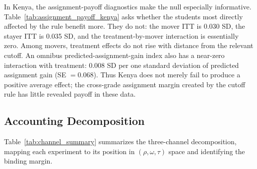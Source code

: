 \documentclass[11pt]{article}
\begin{document}
In Kenya, the assignment-payoff diagnostics make the null especially informative. Table~\ref{tab:assignment_payoff_kenya} asks whether the students most directly affected by the rule benefit more. They do not: the mover ITT is 0.030 SD, the stayer ITT is 0.035 SD, and the treatment-by-mover interaction is essentially zero. Among movers, treatment effects do not rise with distance from the relevant cutoff. An omnibus predicted-assignment-gain index also has a near-zero interaction with treatment: 0.008 SD per one standard deviation of predicted assignment gain (SE $=0.068$). Thus Kenya does not merely fail to produce a positive average effect; the cross-grade assignment margin created by the cutoff rule has little revealed payoff in these data.

\subsection{Accounting Decomposition}

Table~\ref{tab:channel_summary} summarizes the three-channel decomposition, mapping each experiment to its position in $(\rho, \omega, \tau)$ space and identifying the binding margin.
\end{document}
